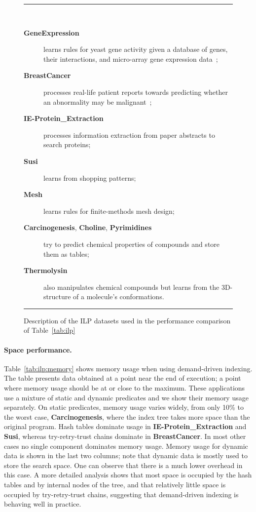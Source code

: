 \documentclass{llncs}
\newcommand{\instr}[1]{\textsf{#1}}
\newcommand{\TryRetryTrust}{\mbox{\instr{try-retry-trust}}\xspace}
\newcommand{\JITI}{demand-driven indexing\xspace}
\newcommand{\bench}[1]{\textbf{\textsf{#1}}}
\newcommand{\BreastCancer}{\bench{BreastCancer}\xspace}
\newcommand{\Carcino}{\bench{Carcinogenesis}\xspace}
\newcommand{\Choline}{\bench{Choline}\xspace}
\newcommand{\GeneExpr}{\bench{GeneExpression}\xspace}
\newcommand{\IEProtein}{\bench{IE-Protein\_Extraction}\xspace}
\newcommand{\Mesh}{\bench{Mesh}\xspace}
\newcommand{\Pyrimidines}{\bench{Pyrimidines}\xspace}
\newcommand{\Susi}{\bench{Susi}\xspace}
\newcommand{\Thermolysin}{\bench{Thermolysin}\xspace}
\begin{document}

\begin{figure}
  \hrule \ \\[-2em]
  \begin{description}
  \item[\GeneExpr] learns rules for yeast gene activity given a
    database of genes, their interactions, and micro-array gene
    expression data~\cite{Regulatory@ILP-06};
  \item[\BreastCancer] processes real-life patient reports towards
    predicting whether an abnormality may be
    malignant~\cite{DavisBDPRCS@IJCAI-05};
  \item[\IEProtein] processes information extraction from paper
    abstracts to search proteins;
  \item[\Susi] learns from shopping patterns;
  \item[\Mesh] learns rules for finite-methods mesh design;
  \item[\Carcino, \Choline, \Pyrimidines] try to predict chemical
    properties of compounds and store them as tables;
  \item[\Thermolysin] also manipulates chemical compounds but learns
    from the 3D-structure of a molecule's conformations.
  \end{description}
  \hrule
  \caption{Description of the ILP datasets used in the performance
    comparison of Table~\ref{tab:ilp}}
  \label{fig:ilp:datasets}
\end{figure}

\paragraph*{Space performance.}
Table~\ref{tab:ilp:memory} shows memory usage when using \JITI. The
table presents data obtained at a point near the end of execution; a
point where memory usage should be at or close to the maximum. These
applications use a mixture of static and dynamic predicates and we
show their memory usage separately. On static predicates, memory usage
varies widely, from only 10\% to the worst case, \Carcino, where the
index tree takes more space than the original program. Hash tables
dominate usage in \IEProtein and \Susi, whereas \TryRetryTrust chains
dominate in \BreastCancer. In most other cases no single component
dominates memory usage. Memory usage for dynamic data is shown in the
last two columns; note that dynamic data is mostly used to store the
search space. One can observe that there is a much lower overhead in
this case. A more detailed analysis shows that most space is occupied
by the hash tables and by internal nodes of the tree, and that
relatively little space is occupied by \TryRetryTrust chains,
suggesting that \JITI is behaving well in practice.
\end{document}
